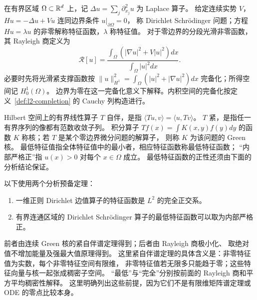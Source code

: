 \begin{definition}\label{def:dirichlet-rayleigh}
在有界区域 $\Omega\subset\mathbb{R}^d$ 上，记 $\Delta u=\sum_j\partial_{x_j}^2u$ 为 Laplace 算子。
给定连续实势 $V$，$Hu=-\Delta u+Vu$ 连同边界条件 $u|_{\partial\Omega}=0$，
称 Dirichlet Schrödinger 问题；方程 $Hu=\lambda u$ 的非零解称特征函数，$\lambda$ 称特征值。
对于零边界的分段光滑非零函数，其 Rayleigh 商定义为
\[
 \mathcal R[u]=\frac{\int_\Omega(|\nabla u|^2+V|u|^2)dx}
 {\int_\Omega|u|^2dx}.
\]
必要时先将光滑紧支撑函数按
$\|u\|_{H^1}^2=\displaystyle\int_\Omega(|u|^2+|\nabla u|^2)dx$ 完备化；所得空间记 $H_0^1(\Omega)$。
边界为零在这一完备化意义下解释。内积空间的完备化按定义~\ref{def:l2-completion} 的 Cauchy 列构造进行。
\end{definition}
\begin{definition}
Hilbert 空间上的有界线性算子 $T$ 自伴，是指 $\langle Tu,v\rangle=\langle u,Tv\rangle$。
$T$ 紧，是指任一有界序列的像都有范数收敛子列。
积分算子 $Tf(x)=\displaystyle\int K(x,y)f(y)dy$ 的函数 $K$ 称核；若 $T$ 是某个零边界微分问题的解算子，
则称 $K$ 为该问题的 Green 核。
最低特征值指全体特征值中的最小者，相应特征函数称最低特征函数；
“内部严格正”指 $u(x)>0$ 对每个 $x\in\Omega$ 成立。
最低特征函数的正性还须由下面的分析结论保证。
\end{definition}

以下使用两个分析预备定理：
\begin{enumerate}
 \item 一维正则 Dirichlet 边值算子的特征函数是 $L^2$ 的完全正交系。
 \item 有界连通区域的 Dirichlet Schrödinger 算子的最低特征函数可以取为内部严格正。
\end{enumerate}
前者由连续 Green 核的紧自伴谱定理得到；后者由 Rayleigh 商极小化、
取绝对值不增加能量及强最大值原理得到。
这里紧自伴谱定理的具体含义是：非零特征值为实数，每个非零特征空间有限维，
非零特征值若无限多只能趋于零；这些特征向量与核一起张成稠密子空间。
“最低”与“完全”分别按前面的 Rayleigh 商和平方平均稠密性解释。
这里明确列出这些前提，因为它们不是有限维矩阵谱定理或 ODE 的零点比较本身。

